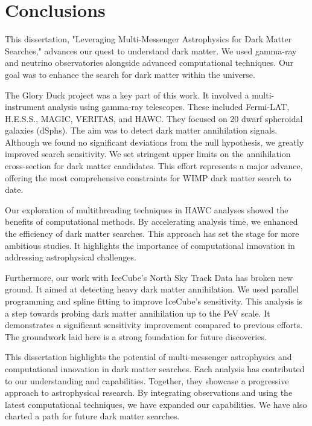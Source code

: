\section{Conclusions}\label{sec:conclusions}

This dissertation, "Leveraging Multi-Messenger Astrophysics for Dark Matter Searches," advances our quest to understand dark matter. We used gamma-ray and neutrino observatories alongside advanced computational techniques. Our goal was to enhance the search for dark matter within the universe.

The Glory Duck project was a key part of this work. It involved a multi-instrument analysis using gamma-ray telescopes. These included Fermi-LAT, H.E.S.S., MAGIC, VERITAS, and HAWC. They focused on 20 dwarf spheroidal galaxies (dSphs). The aim was to detect dark matter annihilation signals. Although we found no significant deviations from the null hypothesis, we greatly improved search sensitivity. We set stringent upper limits on the annihilation cross-section for dark matter candidates. This effort represents a major advance, offering the most comprehensive constraints for WIMP dark matter search to date.

Our exploration of multithreading techniques in HAWC analyses showed the benefits of computational methods. By accelerating analysis time, we enhanced the efficiency of dark matter searches. This approach has set the stage for more ambitious studies. It highlights the importance of computational innovation in addressing astrophysical challenges.

Furthermore, our work with IceCube's North Sky Track Data has broken new ground. It aimed at detecting heavy dark matter annihilation. We used parallel programming and spline fitting to improve IceCube's sensitivity. This analysis is a step towards probing dark matter annihilation up to the PeV scale. It demonstrates a significant sensitivity improvement compared to previous efforts. The groundwork laid here is a strong foundation for future discoveries.

This dissertation highlights the potential of multi-messenger astrophysics and computational innovation in dark matter searches. Each analysis has contributed to our understanding and capabilities. Together, they showcase a progressive approach to astrophysical research. By integrating observations and using the latest computational techniques, we have expanded our capabilities. We have also charted a path for future dark matter searches.

